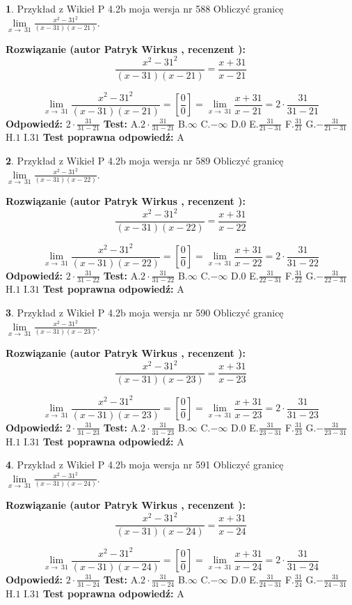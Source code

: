 \documentclass[12pt, a4paper]{article}
\theoremstyle{definition} %
\newtheorem{zad}{}
\newcommand{\zadStart}[1]{\begin{zad}#1\newline}
\newcommand{\zadStop}{\end{zad}}
\newcommand{\rozwStart}[2]{\noindent \textbf{Rozwiązanie (autor #1 , recenzent #2): }\newline}
\newcommand{\rozwStop}{\newline}
\newcommand{\odpStart}{\noindent \textbf{Odpowiedź:}\newline}
\newcommand{\odpStop}{\newline}
\newcommand{\testStart}{\noindent \textbf{Test:}\newline}
\newcommand{\testStop}{\newline}
\newcommand{\kluczStart}{\noindent \textbf{Test poprawna odpowiedź:}\newline}
\newcommand{\kluczStop}{\newline}
\begin{document}
\zadStart{Przykład z Wikieł P 4.2b moja wersja nr 588}
Obliczyć granicę $\lim\limits_{x\to\ 31}\frac{x^{2}-31^{2}}{(x-31)(x-21)}$.
\zadStop
\rozwStart{Patryk Wirkus}{}
$$\frac{x^{2}-31^{2}}{(x-31)(x-21)}=\frac{x+31}{x-21}$$

$$\lim\limits_{x\to\ 31}\frac{x^{2}-31^{2}}{(x-31)(x-21)}=[\frac{0}{0}]=\lim\limits_{x\to\ 31}\frac{x+31}{x-21}=2 \cdot \frac{31}{31-21}$$
\rozwStop
\odpStart
$2 \cdot \frac{31}{31-21}$
\odpStop
\testStart
A.$2 \cdot \frac{31}{31-21}$
B.$\infty$
C.$-\infty$
D.$0$
E.$\frac{31}{21-31}$
F.$\frac{31}{21}$
G.$-\frac{31}{21-31}$
H.$1$
I.$31$
\testStop
\kluczStart
A
\kluczStop



\zadStart{Przykład z Wikieł P 4.2b moja wersja nr 589}
Obliczyć granicę $\lim\limits_{x\to\ 31}\frac{x^{2}-31^{2}}{(x-31)(x-22)}$.
\zadStop
\rozwStart{Patryk Wirkus}{}
$$\frac{x^{2}-31^{2}}{(x-31)(x-22)}=\frac{x+31}{x-22}$$

$$\lim\limits_{x\to\ 31}\frac{x^{2}-31^{2}}{(x-31)(x-22)}=[\frac{0}{0}]=\lim\limits_{x\to\ 31}\frac{x+31}{x-22}=2 \cdot \frac{31}{31-22}$$
\rozwStop
\odpStart
$2 \cdot \frac{31}{31-22}$
\odpStop
\testStart
A.$2 \cdot \frac{31}{31-22}$
B.$\infty$
C.$-\infty$
D.$0$
E.$\frac{31}{22-31}$
F.$\frac{31}{22}$
G.$-\frac{31}{22-31}$
H.$1$
I.$31$
\testStop
\kluczStart
A
\kluczStop



\zadStart{Przykład z Wikieł P 4.2b moja wersja nr 590}
Obliczyć granicę $\lim\limits_{x\to\ 31}\frac{x^{2}-31^{2}}{(x-31)(x-23)}$.
\zadStop
\rozwStart{Patryk Wirkus}{}
$$\frac{x^{2}-31^{2}}{(x-31)(x-23)}=\frac{x+31}{x-23}$$

$$\lim\limits_{x\to\ 31}\frac{x^{2}-31^{2}}{(x-31)(x-23)}=[\frac{0}{0}]=\lim\limits_{x\to\ 31}\frac{x+31}{x-23}=2 \cdot \frac{31}{31-23}$$
\rozwStop
\odpStart
$2 \cdot \frac{31}{31-23}$
\odpStop
\testStart
A.$2 \cdot \frac{31}{31-23}$
B.$\infty$
C.$-\infty$
D.$0$
E.$\frac{31}{23-31}$
F.$\frac{31}{23}$
G.$-\frac{31}{23-31}$
H.$1$
I.$31$
\testStop
\kluczStart
A
\kluczStop



\zadStart{Przykład z Wikieł P 4.2b moja wersja nr 591}
Obliczyć granicę $\lim\limits_{x\to\ 31}\frac{x^{2}-31^{2}}{(x-31)(x-24)}$.
\zadStop
\rozwStart{Patryk Wirkus}{}
$$\frac{x^{2}-31^{2}}{(x-31)(x-24)}=\frac{x+31}{x-24}$$

$$\lim\limits_{x\to\ 31}\frac{x^{2}-31^{2}}{(x-31)(x-24)}=[\frac{0}{0}]=\lim\limits_{x\to\ 31}\frac{x+31}{x-24}=2 \cdot \frac{31}{31-24}$$
\rozwStop
\odpStart
$2 \cdot \frac{31}{31-24}$
\odpStop
\testStart
A.$2 \cdot \frac{31}{31-24}$
B.$\infty$
C.$-\infty$
D.$0$
E.$\frac{31}{24-31}$
F.$\frac{31}{24}$
G.$-\frac{31}{24-31}$
H.$1$
I.$31$
\testStop
\kluczStart
A
\kluczStop
\end{document}
